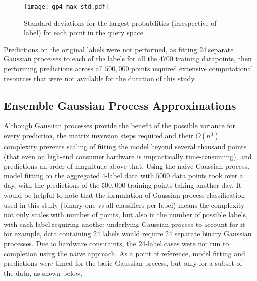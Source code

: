 \begin{figure}
    \centerline{\texttt{[image: gp4\_max\_std.pdf]}}
    \caption{Standard deviations for the largest probabilities (irrespective of label) for each point in the query space}
    \label{fig:gp4_vars}
\end{figure}


Predictions on the original labels were not performed, as fitting $24$ separate Gaussian processes to each of the labels for all the $4700$ training datapoints, then performing predictions across all $500,000$ points required extensive computational resources that were not available for the duration of this study.

\subsection{Ensemble Gaussian Process Approximations}

Although Gaussian processes provide the benefit of the possible variance for every prediction, the matrix inversion steps required and their $O(n^3)$ complexity prevents scaling of fitting the model beyond several thousand points (that even on high-end consumer hardware is impractically time-consuming), and predictions an order of magnitude above that. Using the naive Gaussian process, model fitting on the aggregated $4$-label data with $5000$ data points took over a day, with the predictions of the $500,000$ training points taking another day. It would be helpful to note that the formulation of Gaussian process classification used in this study (binary one-vs-all classifiers per label) means the complexity not only scales with number of points, but also in the number of possible labels, with each label requiring another underlying Gaussian process to account for it - for example, data containing $24$ labels would require 24 separate binary Gaussian processes. Due to hardware constraints, the $24$-label cases were not run to completion using the naive approach. As a point of reference, model fitting and predictions were timed for the basic Gaussian process, but only for a subset of the data, as shown below.

